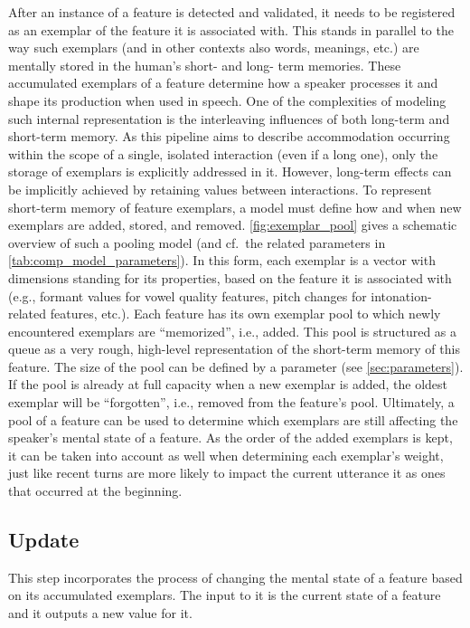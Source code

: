 After an instance of a feature is detected and validated, it needs to be registered as an exemplar of the feature it is associated with.
This stands in parallel to the way such exemplars (and in other contexts also words, meanings, etc.) are mentally stored in the human's short- and long- term memories.
These accumulated exemplars of a feature determine how a speaker processes it and shape its production when used in speech.
One of the complexities of modeling such internal representation is the interleaving influences of both long-term and short-term memory.
As this pipeline aims to describe accommodation occurring within the scope of a single, isolated interaction (even if a long one), only the storage of exemplars is explicitly addressed in it.
However, long-term effects can be implicitly achieved by retaining values between interactions.
To represent short-term memory of feature exemplars, a model must define how and when new exemplars are added, stored, and removed.
\cref{fig:exemplar_pool} gives a schematic overview of such a pooling model (and cf.\ the related parameters in \cref{tab:comp_model_parameters}).
In this form, each exemplar is a vector with dimensions standing for its properties, based on the feature it is associated with (e.g., formant values for vowel quality features, pitch changes for intonation-related features, etc.).
Each feature has its own exemplar pool to which newly encountered exemplars are \enquote{memorized}, i.e., added.
This pool is structured as a queue as a very rough, high-level representation of the short-term memory of this feature.
The size of the pool can be defined by a parameter (see \cref{sec:parameters}).
If the pool is already at full capacity when a new exemplar is added, the oldest exemplar will be \enquote{forgotten}, i.e., removed from the feature's pool.
Ultimately, a pool of a feature can be used to determine which exemplars are still affecting the speaker's mental state of a feature.
As the order of the added exemplars is kept, it can be taken into account as well when determining each exemplar's weight, just like recent turns are more likely to impact the current utterance it as ones that occurred at the beginning.

\subsection{Update}
\label{subsec:update}

This step incorporates the process of changing the mental state of a feature based on its accumulated exemplars.
The input to it is the current state of a feature and it outputs a new value for it.

